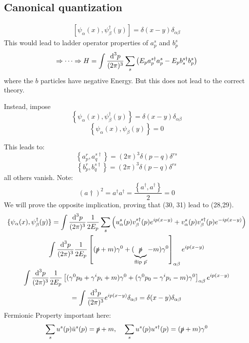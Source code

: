 \documentclass[]{scrartcl}
\begin{document}
\subsection{Canonical quantization}
\begin{gather}
	\left[\psi_\alpha(x), \psi_\beta^\dagger(y)\right] = \delta(x-y)\delta_{\alpha\beta}
\end{gather}
This would lead to ladder operator properties of $a_p^s$ and $b_p^s$
\begin{equation}
	\Rightarrow \cdots \Rightarrow H = \int\frac{\text d^3p}{(2\pi)^3}\sum_s \left(E_p a_p^{s\dagger}a_p^s - E_p b_s^{s\dagger}b_p^s\right)
\end{equation}
where the $b$ particles have negative Energy. But this does not lead to the correct theory.

Instead, impose
\begin{equation}
	\left\{\psi_\alpha(x), \psi_\beta^\dagger(y)\right\} = \delta(x-y)\delta_{\alpha\beta}
\end{equation}
\begin{equation}
	\left\{\psi_\alpha(x), \psi_\beta(y)\right\} = 0
\end{equation}

This leads to:
\begin{equation}
	\left\{a_p^r, a_q^{s\dagger}\right\} = (2\pi)^3\delta(p-q)\delta^{rs}
\end{equation}
\begin{equation}
	\left\{b_p^r, b_q^{s\dagger}\right\} = (2\pi)^3\delta(p-q)\delta^{rs}
\end{equation}
all others vanish. Note:
\begin{equation}
	(a\dagger)^2 = a^\dagger a^\dagger = \frac{\left\{a^\dagger, a^\dagger\right\}}{2} = 0
\end{equation}
We will prove the opposite implication, proving that (30, 31) lead to (28,29).
\begin{gather}
	\{\psi_\alpha(x),\psi_\beta^\dagger(y)\} = \int\frac{\text d^3p}{(2\pi)^3}\frac{1}{2E_p}\sum_s \left( u_\alpha^s(p)v^{s\dagger}_\beta(p) e^{ip(x-y)} + v^s_\alpha(p)v_\beta^{s\dagger}(p) e^{-ip(x-y)} \right)\\
	\int\frac{\text d^3p}{(2\pi)^3} \frac{1}{2E_p}\left[ (\slashed p + m)\gamma^0 + (\underbrace{\slashed p}_{\text{flip $\vec p$}} - m)\gamma^0 \right]_{\alpha\beta}e^{ip(x-y)}\\
	\int \frac{\text d^3p}{(2\pi)^3}\frac{1}{2E_p}\left[ (\gamma^0 p_0 + \gamma^ip_i + m)\gamma^0 + (\gamma^0p_0 - \gamma^ip_i -m)\gamma^0 \right]_{\alpha\beta}e^{ip(x-y)}\\
	= \int\frac{\text d^3p}{(2\pi)^3}e^{ip(x-y)}\delta_{\alpha\beta} = \delta(x-y)\delta_{\alpha\beta}
\end{gather}
Fermionic Property important here:
\begin{equation}
	\sum_s u^s(p)\bar u^s(p) = \slashed p + m, \;\;\;\; \sum_s u^s(p)u^{s\dagger}(p) = (\slashed p + m) \gamma^0
\end{equation}
\end{document}

